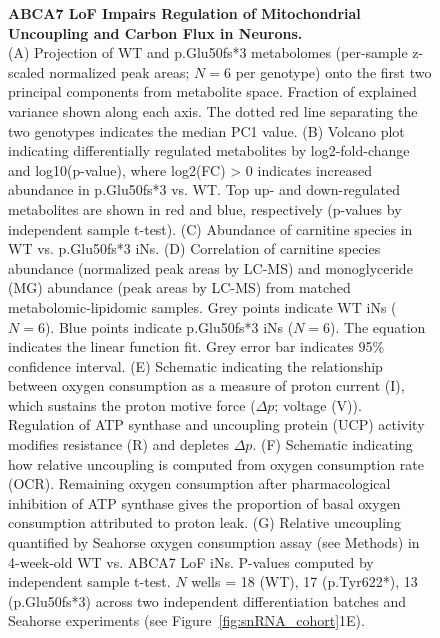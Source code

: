 \begin{figure}[ht]
\begin{subfigure}[t]{.15\textwidth}
    \end{subfigure}  
    \caption{
        \textbf{ABCA7 LoF Impairs Regulation of Mitochondrial Uncoupling and Carbon Flux in Neurons.}\\[1ex]
        (A) Projection of WT and p.Glu50fs*3 metabolomes (per-sample z-scaled normalized peak areas; $N=6$ per genotype) onto the first two principal components from metabolite space. Fraction of explained variance shown along each axis. The dotted red line separating the two genotypes indicates the median PC1 value. 
        (B) Volcano plot indicating differentially regulated metabolites by log2-fold-change and log10(p-value), where log2(FC) > 0 indicates increased abundance in p.Glu50fs*3 vs. WT. Top up- and down-regulated metabolites are shown in red and blue, respectively (p-values by independent sample t-test). 
        (C) Abundance of carnitine species in WT vs. p.Glu50fs*3 iNs. 
        (D) Correlation of carnitine species abundance (normalized peak areas by LC-MS) and monoglyceride (MG) abundance (peak areas by LC-MS) from matched metabolomic-lipidomic samples. Grey points indicate WT iNs ($N=6$). Blue points indicate p.Glu50fs*3 iNs ($N=6$). The equation indicates the linear function fit. Grey error bar indicates 95\% confidence interval. 
        (E) Schematic indicating the relationship between oxygen consumption as a measure of proton current (I), which sustains the proton motive force ($\Delta p$; voltage (V)). Regulation of ATP synthase and uncoupling protein (UCP) activity modifies resistance (R) and depletes $\Delta p$. 
        (F) Schematic indicating how relative uncoupling is computed from oxygen consumption rate (OCR). Remaining oxygen consumption after pharmacological inhibition of ATP synthase gives the proportion of basal oxygen consumption attributed to proton leak. 
        (G) Relative uncoupling quantified by Seahorse oxygen consumption assay (see Methods) in 4-week-old WT vs. ABCA7 LoF iNs. P-values computed by independent sample t-test. $N$ wells = 18 (WT), 17 (p.Tyr622*), 13 (p.Glu50fs*3) across two independent differentiation batches and Seahorse experiments (see Figure~\ref{fig:snRNA_cohort}1E). 
}
\end{figure}
